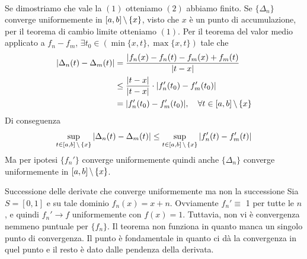 \documentclass[a4paper]{article}
\begin{document}
\begin{snippetproof}{}
\begin{align*}
    \end{align*}
    Se dimostriamo che vale la \((1)\) otteniamo \((2)\) abbiamo finito.
    Se \(\{\Delta_n\}\) converge uniformemente in \([a,b]\,\backslash\, \{x\}\), visto
    che \(x\) è un punto di accumulazione, per il teorema di cambio limite otteniamo \((1)\).
    Per il teorema del valor medio applicato a \(f_n - f_m\), \(\exists t_0 \in \left(\min\{x, t\}, \max\{x,t\}\right)\) tale che
    \begin{align*}
        |\Delta_n(t) - \Delta_m(t)| &= \frac{
            |f_n(x) - f_n(t) - f_m(x) + f_m(t)
        }{
            |t-x|
        } \\
        &\leq \frac{|t-x|}{|t-x|} \cdot |f_n'(t_0) - f_m'(t_0)| \\
        &= |f_n'(t_0) - f_m'(t_0)|, \quad \forall t \in [a,b]\,\backslash\, \{x\}
    \end{align*}
    Di conseguenza 
    \[
        \sup_{t\in [a,b]\,\backslash\, \{x\}} |\Delta_n(t) - \Delta_m(t)| \leq
        \sup_{t\in [a,b] \,\backslash\, \{x\}} |f_n'(t) - f_m'(t)|
    \]
    Ma per ipotesi \(\{f_n'\}\) converge uniformemente quindi anche \(\{\Delta_n\}\) converge uniformemente in \([a,b] \,\backslash\, \{x\}\).
\end{snippetproof}

\begin{snippetexample}{Successione delle derivate che converge uniformemente ma non la successione}
    Sia \(S = [0,1]\) e su tale dominio \(f_n(x) = x + n\).
    Ovviamente \(f_n' \equiv\) 1 per tutte le \(n\), e quindi \(f_n' \to f\)
    uniformemente con \(f(x) = 1\).
    Tuttavia, non vi è convergenza nemmeno puntuale per \(\{f_n\}\).
    Il teorema non funziona in quanto manca un singolo punto di convergenza.
    Il punto è fondamentale in quanto ci dà la convergenza in quel punto e il resto è dato
    dalle pendenza della derivata.
\end{snippetexample}
\end{document}
